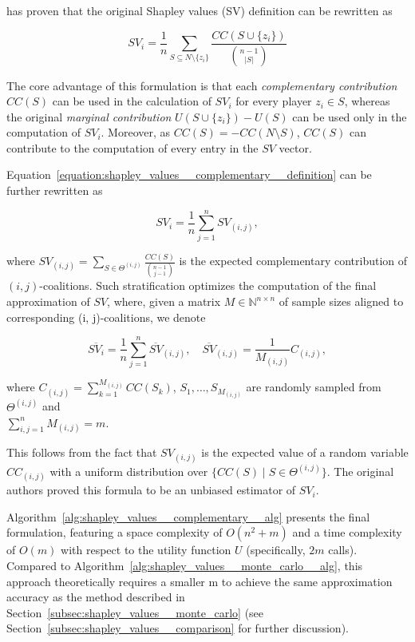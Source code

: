 \textcite{shapleyapproximations} has proven that the original Shapley values (SV) definition can be rewritten as

\begin{equation}
\label{equation:shapley_values__complementary__definition}
SV_i = \frac{1}{n} \sum_{S \subseteq N \setminus \{z_i\}} \frac{CC(S \cup \{z_i\})}{{n - 1 \choose |S|}}
\end{equation}

\noindent The core advantage of this formulation is that each \textit{complementary contribution} $CC(S)$ can be used in the calculation of $SV_i$ for every player $z_i \in S$, whereas the original \textit{marginal contribution} $U(S \cup \{z_i\}) - U(S)$ can be used only in the computation of $SV_i$. Moreover, as $CC(S) = -CC(N \setminus S)$, $CC(S)$ can contribute to the computation of every entry in the $SV$ vector.

Equation~\ref{equation:shapley_values__complementary__definition} can be further rewritten as

\[
SV_i = \frac{1}{n} \sum_{j=1}^n SV_{(i, j)},
\]

\noindent where $SV_{(i, j)} = \sum_{S \in \Theta^{(i, j)}} \frac{CC(S)}{{n - 1 \choose j - 1}}$ is the expected complementary contribution of $(i, j)$-coalitions. Such stratification optimizes the computation of the final approximation of $SV$, where, given a matrix $M \in \mathbb{N}^{n \times n}$ of sample sizes aligned to corresponding (i, j)-coalitions, we denote

\[
\overline{SV_i} = \frac{1}{n} \sum_{j = 1}^n \overline{SV}_{(i, j)}, \quad
\overline{SV}_{(i, j)} = \frac{1}{M_{(i, j)}} C_{(i, j)},
\]

\noindent where $C_{(i, j)} = \sum_{k = 1}^{M_{(i, j)}} CC(S_k)$,  $S_1, \dots, S_{M_{(i, j)}}$ are randomly sampled from $\Theta^{(i, j)}$ and \\ $\sum_{i, j = 1}^n M_{(i, j)} = m$.

This follows from the fact that $SV_{(i, j)}$ is the expected value of a random variable $CC_{(i, j)}$ with a uniform distribution over $\{CC(S) \mid S \in \Theta^{(i, j)} \}$. The original authors proved this formula to be an unbiased estimator of $SV_i$.

Algorithm~\ref{alg:shapley_values__complementary__alg} presents the final formulation, featuring a space complexity of $O(n^2 + m)$ and a time complexity of $O(m)$ with respect to the utility function $U$ (specifically, $2m$ calls). Compared to Algorithm~\ref{alg:shapley_values__monte_carlo__alg}, this approach theoretically requires a smaller m to achieve the same approximation accuracy as the method described in Section~\ref{subsec:shapley_values__monte_carlo} (see Section~\ref{subsec:shapley_values__comparison} for further discussion).

